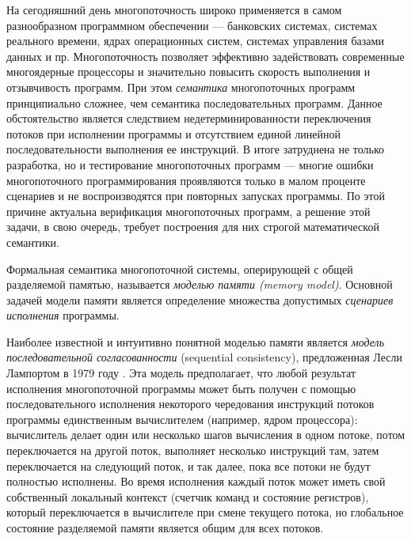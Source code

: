 
{\actuality} 
На сегодняшний день  многопоточность широко применяется в самом разнообразном программном обеспечении ---
банковских системах, системах реального времени, ядрах операционных систем,
системах управления базами данных и пр.
Многопоточность позволяет эффективно задействовать современные многоядерные процессоры и
значительно повысить скорость выполнения и отзывчивость программ.
При этом \emph{семантика} многопоточных программ принципиально сложнее,
чем семантика последовательных программ.
Данное обстоятельство является следствием недетерминированности переключения потоков при исполнении
программы и отсутствием единой линейной последовательности выполнения ее инструкций.
В итоге затруднена  не только разработка, но и тестирование многопоточных программ  --- 
многие ошибки многопоточного программирования проявляются только в малом проценте сценариев  и 
не воспроизводятся  при повторных запусках программы.
По этой причине актуальна  верификация многопоточных программ, а
решение этой задачи, в свою очередь, требует построения  для них 
строгой математической  семантики.

Формальная семантика многопоточной системы, оперирующей с общей разделяемой памятью,
называется \emph{моделью памяти (memory model)}. 
Основной задачей модели памяти является определение множества 
допустимых \emph{сценариев исполнения} программы.

Наиболее известной и интуитивно понятной моделью памяти является 
\emph{модель последовательной согласованности} (sequential consistency),
предложенная Лесли Лампортом в 1979 году \cite{Lamport:TC79}.
Эта модель предполагает, что любой результат исполнения многопоточной программы может быть
получен с помощью последовательного исполнения некоторого чередования инструкций потоков программы
единственным вычислителем (например, ядром процессора): вычислитель делает один или несколько шагов вычисления в одном потоке, потом переключается на другой поток,
выполняет несколько инструкций там, затем переключается на следующий поток, и так далее, пока
все потоки не будут полностью исполнены. 
Во время исполнения каждый поток может иметь свой собственный  локальный контекст
(счетчик команд и состояние регистров),
который переключается в вычислителе при смене текущего потока, 
но глобальное состояние разделяемой памяти является общим для всех потоков.

